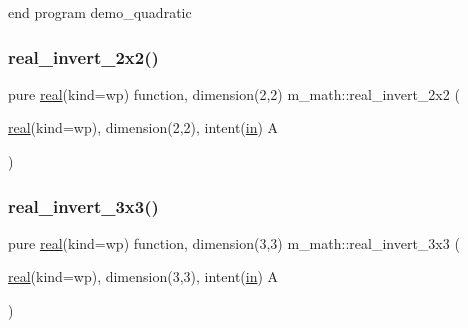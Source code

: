 end program demo\+\_\+quadratic \mbox{\label{namespacem__math_aa8b68ce8fb1a10c992e769f2e042979e}} 
\subsubsection{\texorpdfstring{real\+\_\+invert\+\_\+2x2()}{real\_invert\_2x2()}}
{\footnotesize\ttfamily pure \hyperlink{read__watch_83_8txt_abdb62bde002f38ef75f810d3a905a823}{real}(kind=wp) function, dimension(2,2) m\+\_\+math\+::real\+\_\+invert\+\_\+2x2 (\begin{DoxyParamCaption}\item[{\hyperlink{read__watch_83_8txt_abdb62bde002f38ef75f810d3a905a823}{real}(kind=wp), dimension(2,2), intent(\hyperlink{M__journal_83_8txt_afce72651d1eed785a2132bee863b2f38}{in})}]{A }\end{DoxyParamCaption})\hspace{0.3cm}{\ttfamily [private]}}

\mbox{\label{namespacem__math_a79f32ff4d35916ca4422bb8ce0d30113}} 
\subsubsection{\texorpdfstring{real\+\_\+invert\+\_\+3x3()}{real\_invert\_3x3()}}
{\footnotesize\ttfamily pure \hyperlink{read__watch_83_8txt_abdb62bde002f38ef75f810d3a905a823}{real}(kind=wp) function, dimension(3,3) m\+\_\+math\+::real\+\_\+invert\+\_\+3x3 (\begin{DoxyParamCaption}\item[{\hyperlink{read__watch_83_8txt_abdb62bde002f38ef75f810d3a905a823}{real}(kind=wp), dimension(3,3), intent(\hyperlink{M__journal_83_8txt_afce72651d1eed785a2132bee863b2f38}{in})}]{A }\end{DoxyParamCaption})\hspace{0.3cm}{\ttfamily [private]}}

\mbox{\label{namespacem__math_a09e9433fe80e44fc0b63d815d2ee389a}} 
